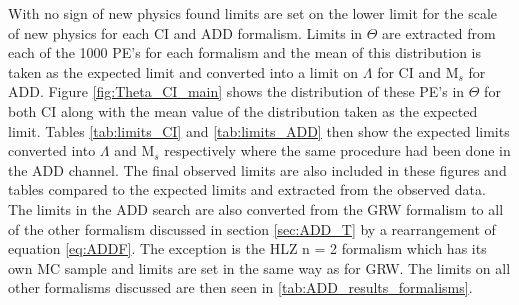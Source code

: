     With no sign of new physics found limits are set on the lower limit for the scale of new physics for each CI and ADD formalism. Limits in $\Theta$ are extracted from each of the 1000 PE's for each formalism and the mean of this distribution is taken as the expected limit and converted into a limit on $\Lambda$ for CI and M$_{s}$ for ADD. Figure \ref{fig:Theta_CI_main} shows the distribution of these PE's in $\Theta$ for both CI along with the mean value of the distribution taken as the expected limit. Tables \ref{tab:limits_CI} and \ref{tab:limits_ADD} then show the expected limits converted into $\Lambda$ and M$_{s}$ respectively where the same procedure had been done in the ADD channel. The final observed limits are also included in these figures and tables compared to the expected limits and extracted from the observed data. The limits in the ADD search are also converted from the GRW formalism to all of the other formalism discussed in section \ref{sec:ADD_T} by a rearrangement of equation \ref{eq:ADDF}. The exception is the HLZ n = 2 formalism which has its own MC sample and limits are set in the same way as for GRW. The limits on all other formalisms discussed are then seen in \ref{tab:ADD_results_formalisms}.


